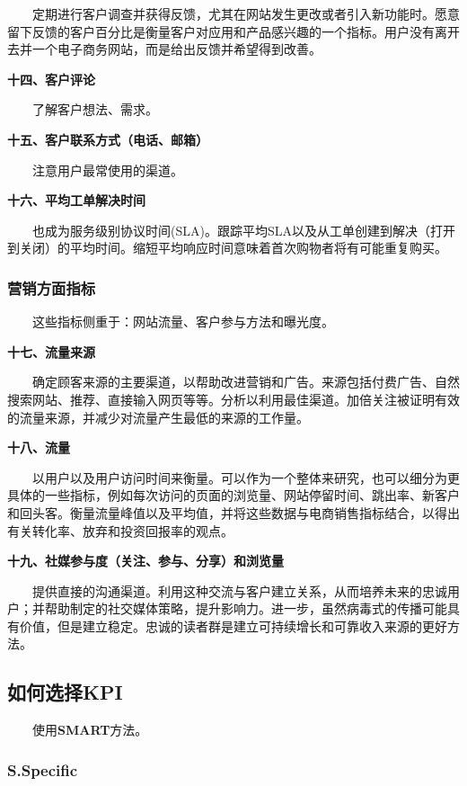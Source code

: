 \documentclass[
  letterpaper,
  DIV=11,
  numbers=noendperiod]{scrreprt}
\begin{document}
  定期进行客户调查并获得反馈，尤其在网站发生更改或者引入新功能时。愿意留下反馈的客户百分比是衡量客户对应用和产品感兴趣的一个指标。用户没有离开去并一个电子商务网站，而是给出反馈并希望得到改善。

\textbf{十四、客户评论}

  了解客户想法、需求。

\textbf{十五、客户联系方式（电话、邮箱）}

  注意用户最常使用的渠道。

\textbf{十六、平均工单解决时间}

  也成为服务级别协议时间(SLA)。跟踪平均SLA以及从工单创建到解决（打开到关闭）的平均时间。缩短平均响应时间意味着首次购物者将有可能重复购买。

\subsubsection{\texorpdfstring{\textbf{营销方面指标}}{营销方面指标}}\label{ux8425ux9500ux65b9ux9762ux6307ux6807}

  这些指标侧重于：网站流量、客户参与方法和曝光度。

\textbf{十七、流量来源}

  确定顾客来源的主要渠道，以帮助改进营销和广告。来源包括付费广告、自然搜索网站、推荐、直接输入网页等等。分析以利用最佳渠道。加倍关注被证明有效的流量来源，并减少对流量产生最低的来源的工作量。

\textbf{十八、流量}

  以用户以及用户访问时间来衡量。可以作为一个整体来研究，也可以细分为更具体的一些指标，例如每次访问的页面的浏览量、网站停留时间、跳出率、新客户和回头客。衡量流量峰值以及平均值，并将这些数据与电商销售指标结合，以得出有关转化率、放弃和投资回报率的观点。

\textbf{十九、社媒参与度（关注、参与、分享）和浏览量}

  提供直接的沟通渠道。利用这种交流与客户建立关系，从而培养未来的忠诚用户；并帮助制定的社交媒体策略，提升影响力。进一步，虽然病毒式的传播可能具有价值，但是建立稳定。忠诚的读者群是建立可持续增长和可靠收入来源的更好方法。

\subsection{如何选择KPI}\label{ux5982ux4f55ux9009ux62e9kpi}

  使用\textbf{SMART}方法。

\subsubsection{S.Specific}\label{s.specific}
\end{document}
